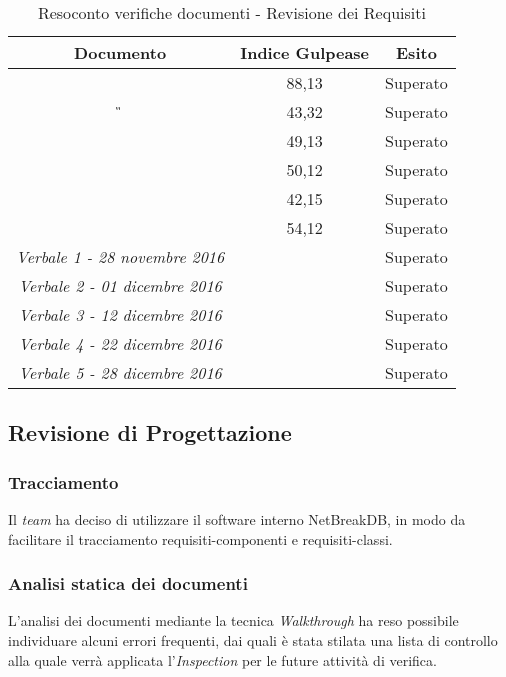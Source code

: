 			\begin{table}[H]
			\begin{center}
				\begin{tabular}{|c|c|c|}
					\hline
					\textbf{Documento}&	{\textbf{Indice Gulpease}} & \textbf{Esito} \\
					\hline
					\textit{\AdR}		&	88,13	&	Superato	\\
					\hline
					\textit{\G}			&	43,32	&	Superato	\\
					\hline
					\textit{\NdP}		&	49,13	&	Superato	\\
					\hline
					\textit{\PdP} 		&	50,12	&	Superato 	\\
					\hline
					\textit{\PdQ} 		&	42,15	&	Superato	\\
					\hline
					\textit{\SdF}		& 	54,12	&	Superato	\\
					\hline
					\textit{Verbale 1 - 28 novembre 2016}		& 		&	Superato	\\
					\hline
					\textit{Verbale 2 - 01 dicembre 2016}		& 		&	Superato	\\
					\hline
					\textit{Verbale 3 - 12 dicembre 2016}		& 		&	Superato	\\
					\hline
					\textit{Verbale 4 - 22 dicembre 2016}		& 		&	Superato	\\
					\hline
					\textit{Verbale 5 - 28 dicembre 2016}		& 		&	Superato	\\
					\hline
				\end{tabular}
			\end{center}
			\caption{Resoconto verifiche documenti - Revisione dei Requisiti}
		\end{table}
	
	\subsection{Revisione di Progettazione}
	
	\subsubsection{Tracciamento}
	Il \textit{team} ha deciso di utilizzare il software interno NetBreakDB, in modo da facilitare il tracciamento requisiti-componenti e requisiti-classi.
	
	\subsubsection{Analisi statica dei documenti}
	L’analisi dei documenti mediante la tecnica \textit{Walkthrough} ha reso possibile individuare alcuni errori frequenti, dai quali è stata stilata una lista di controllo alla quale verrà applicata l’\textit{Inspection} per le future attività di verifica.
	
